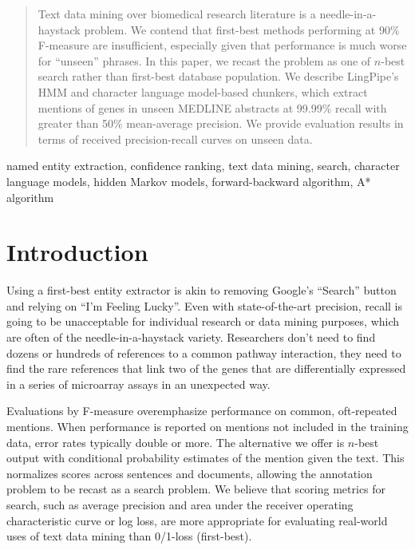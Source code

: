 \documentclass[twoside,11pt]{article}
\begin{document}
\begin{abstract}
Text data mining over biomedical research literature is a
needle-in-a-haystack problem.  We contend that first-best methods
performing at 90\% F-measure are insufficient, especially given that
performance is much worse for ``unseen'' phrases.  In this paper, we
recast the problem as one of $n$-best search rather than first-best
database population.  We describe LingPipe's HMM and character
language model-based chunkers, which extract mentions of genes in
unseen MEDLINE abstracts at 99.99\% recall with greater than 50\%
mean-average precision.  We provide evaluation results in terms of
received precision-recall curves on unseen data.
\end{abstract}

named entity extraction, confidence ranking, text data mining, search,
character language models, hidden Markov models, forward-backward
algorithm, A* algorithm


\section{Introduction}

Using a first-best entity extractor is akin to removing Google's
``Search'' button and relying on ``I'm Feeling Lucky''.  Even with
state-of-the-art precision, recall is going to be unacceptable for
individual research or data mining purposes, which are often of the
needle-in-a-haystack variety.  Researchers don't need to find dozens
or hundreds of references to a common pathway interaction, they need
to find the rare references that link two of the genes that are
differentially expressed in a series of microarray assays in an
unexpected way.

Evaluations by F-measure overemphasize performance on common,
oft-repeated mentions.  When performance is reported on mentions not
included in the training data, error rates typically double or more.
The alternative we offer is $n$-best output with conditional
probability estimates of the mention given the text.  This normalizes
scores across sentences and documents, allowing the annotation problem
to be recast as a search problem.  We believe that scoring metrics for
search, such as average precision and area under the receiver
operating characteristic curve or log loss, are more appropriate for
evaluating real-world uses of text data mining than 0/1-loss
(first-best).
\end{document}
